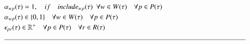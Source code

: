 {\begin{alignat}{2}
		& \VarStrategicWorkOrderAssignment{\ElementWorkOrder}{\ElementPeriod} = 1,                                                            \quad if\quad \ParStrategicInclude \ \ \forall \ElementWorkOrder \in \SetWorkOrder{}\quad \forall \ElementPeriod \in \SetPeriod                                                                                                                                                                                              \label{eqn:strategic:constraint:exclude}\\
		& \VarStrategicWorkOrderAssignment{\ElementWorkOrder}{\ElementPeriod} \in \{0, 1\}                                                   \quad \forall \ElementWorkOrder \in \SetWorkOrder{} \quad \forall \ElementPeriod \in \SetPeriod                                                                                                                                                                           \label{eqn:variable:strategic:assignment}      \\ 
		& \VarStrategicExcess \in \mathbb{R}^{+}                                                                                             \quad \forall \ElementPeriod \in \SetPeriod \quad \forall \ElementResource \in \SetResource                                                                                                                                                                               \label{eqn:variable:strateigc:penalty}\\ 
		& \text{\rule{\linewidth}{0.4pt}} \notag
	\end{alignat}
}
